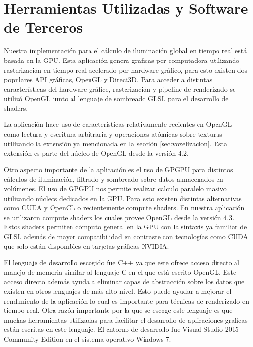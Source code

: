\section{Herramientas Utilizadas y Software de Terceros}
Nuestra implementación para el cálculo de iluminación global en tiempo real está basada en la \ac{GPU}. Esta aplicación genera graficas por computadora utilizando rasterización en tiempo real acelerado por hardware gráfico, para esto existen dos populares API gráficas, OpenGL y Direct3D. Para acceder a distintas características del hardware gráfico, rasterización y pipeline de renderizado se utilizó OpenGL junto al lenguaje de sombreado GLSL para el desarrollo de shaders. 

La aplicación hace uso de características relativamente recientes en OpenGL como lectura y escritura arbitraria y operaciones atómicas sobre texturas utilizando la extensión ya mencionada en la sección \ref{sec:voxelizacion}. Esta extensión es parte del núcleo de OpenGL desde la versión 4.2. 

Otro aspecto importante de la aplicación es el uso de \ac{GPGPU} para distintos cálculos de iluminación, filtrado y sombreado sobre datos almacenados en volúmenes. El uso de \ac{GPGPU} nos permite realizar calculo paralelo masivo utilizando núcleos dedicados en la \ac{GPU}. Para esto existen distintas alternativas como CUDA y OpenCL o recientemente compute shaders. En nuestra aplicación se utilizaron compute shaders los cuales provee OpenGL desde la versión 4.3. Estos shaders permiten cómputo general en la GPU con la sintaxis ya familiar de GLSL además de mayor compatibilidad en contraste con tecnologías como CUDA que solo están disponibles en tarjetas gráficas NVIDIA.

El lenguaje de desarrollo escogido fue C++ ya que este ofrece acceso directo al manejo de memoria similar al lenguaje C en el que está escrito OpenGL. Este acceso directo además ayuda a eliminar capas de abstracción sobre los datos que existen en otros lenguajes de más alto nivel. Esto puede ayudar a mejorar el rendimiento de la aplicación lo cual es importante para técnicas de renderizado en tiempo real. Otra razón importante por la que se escoge este lenguaje es que muchas herramientas utilizadas para facilitar el desarrollo de aplicaciones graficas están escritas en este lenguaje. El entorno de desarrollo fue Visual Studio 2015 Community Edition en el sistema operativo Windows 7.

